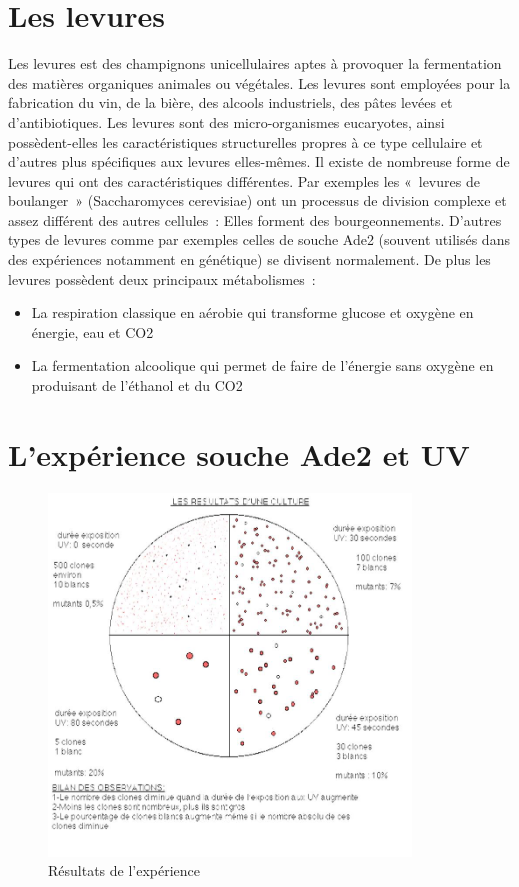 \section{Les levures}
Les levures est des champignons unicellulaires aptes à provoquer la fermentation des matières organiques animales ou végétales. Les levures sont employées pour la fabrication du vin, de la bière, des alcools industriels, des pâtes levées et d'antibiotiques. Les levures sont des micro-organismes eucaryotes, ainsi possèdent-elles les caractéristiques structurelles propres à ce type cellulaire et d'autres plus spécifiques aux levures elles-mêmes. Il existe de nombreuse forme de levures qui ont des caractéristiques différentes. Par exemples les « levures de boulanger » (Saccharomyces cerevisiae) ont un processus de division complexe et assez différent des autres cellules : Elles forment des bourgeonnements. D’autres types de levures comme par exemples celles de souche Ade2 (souvent utilisés dans des expériences notamment  en génétique) se divisent normalement. De plus les levures possèdent deux principaux métabolismes :

\begin{itemize}
	\item La respiration classique en aérobie qui transforme glucose et oxygène en énergie, eau et CO2 
	\item La fermentation alcoolique qui permet de faire de l’énergie sans oxygène en produisant de l’éthanol  et du CO2
\end{itemize}

\section{L’expérience souche Ade2 et UV}
\begin{figure}[H]
	\centering
	\includegraphics[width=26em]{Annexes/Images/lev.jpg}
	\caption{Résultats de l'expérience}
\end{figure}

